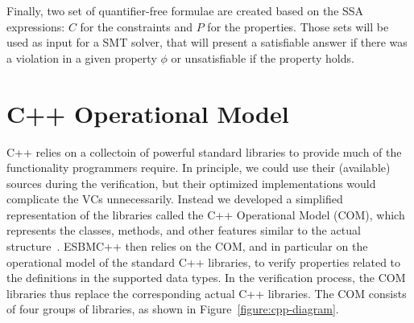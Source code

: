 \documentclass[conference]{IEEEtran}
\begin{document}
Finally, two set of quantifier-free formulae are created based on the SSA expressions:
$C$ for the constraints and $P$ for the properties. Those sets will be used as input for
a SMT solver, that will present a satisfiable answer if there was a violation in a given
property $\phi$ or unsatisfiable if the property holds.

\section{C++ Operational Model}
\label{cpp-operational-model}



C++ relies on a collectoin of powerful standard libraries to provide
much of the functionality programmers require. In principle, we could use
their (available) sources during the verification, but their optimized
implementations would complicate the VCs unnecessarily. Instead
we developed a simplified representation of the
libraries called the C++ Operational Model (COM), which represents the
classes, methods, and other features similar to the actual
structure~\cite{CppReference12}.
ESBMC++ then relies on the COM, and in particular on the
operational model of the standard C++ libraries, to
verify properties related to the definitions in the supported data
types.
In the verification process, the COM libraries
thus replace the corresponding actual C++ libraries.
The COM consists of four groups of libraries,
as shown in Figure~\ref{figure:cpp-diagram}.
\end{document}
